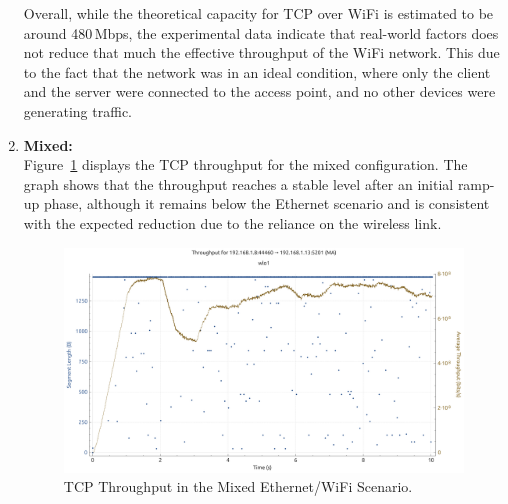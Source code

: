 \begin{enumerate}

                Overall, while the theoretical capacity for TCP over WiFi is estimated to be around 480\,Mbps, the experimental data indicate that real-world factors does not reduce that much the effective throughput of the WiFi network. 
                This due to the fact that the network was in an ideal condition, where only the client and the server were connected to the access point, and no other devices were generating traffic.

            \vspace{0.2cm} %

            \item \textbf{Mixed:} \\
                Figure~\ref{fig:throughput-mix-tcp} displays the TCP throughput for the mixed configuration. 
                The graph shows that the throughput reaches a stable level after an initial ramp-up phase, although it remains below the Ethernet scenario and is consistent with the expected reduction due to the reliance on the wireless link.

                \begin{figure}[ht]
                    \centering
                    \includegraphics[width=0.9\columnwidth]{images/graphs/Throughput/Throughput_MIX_TCP.pdf}
                    \caption{TCP Throughput in the Mixed Ethernet/WiFi Scenario.}
                    \label{fig:throughput-mix-tcp}
                \end{figure}


\end{enumerate}
